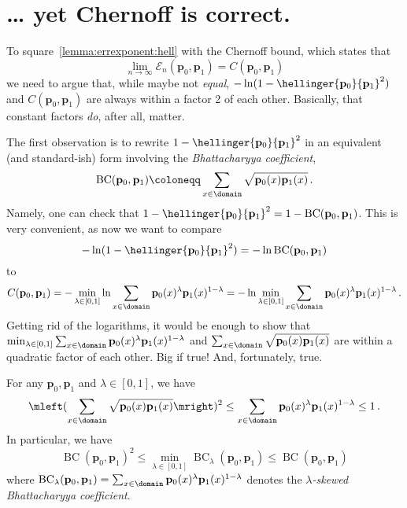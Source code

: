 \documentclass[10pt]{article}
\renewcommand{\eqdef}{\coloneqq}
\newcommand{\p}{\mathbf{p}}
\newcommand{\ns}{n}
\newcommand{\errexp}{\mathcal{E}}
\begin{document}
\section{\dots{} yet Chernoff is correct.}
To square~\autoref{lemma:errexponent:hell} with the Chernoff bound, which states that
\begin{equation}
	\lim_{\ns\to \infty}\errexp_\ns(\p_0,\p_1) = C(\p_0,\p_1)
\end{equation}
we need to argue that, while maybe not \emph{equal}, $-\ln(1-\hellinger{\p_0}{\p_1}^2)$ and $C(\p_0,\p_1)$ are always within a factor 2 of each other. Basically, that constant factors \emph{do}, after all, matter.

The first observation is to rewrite $1-\hellinger{\p_0}{\p_1}^2$ in an equivalent (and standard-ish) form involving the \emph{Bhattacharyya coefficient},
\begin{equation}
	\operatorname{BC}(\p_0,\p_1) \eqdef \sum_{x\in\domain} \sqrt{\p_0(x) \p_1(x)}\,.
\end{equation}
Namely, one can check that 
$
1-\hellinger{\p_0}{\p_1}^2 = 1 - \operatorname{BC}(\p_0,\p_1)$. This is very convenient, as now we want to compare
\[
	-\ln(1-\hellinger{\p_0}{\p_1}^2)
	= -\ln \operatorname{BC}(\p_0,\p_1)
\]
to
\[
	C(\p_0,\p_1) 
	= -\min_{\lambda\in[0,1]} \ln \sum_{x\in\domain} \p_0(x)^\lambda\p_1(x)^{1-\lambda} 
	= - \ln  \min_{\lambda\in[0,1]} \sum_{x\in\domain} \p_0(x)^\lambda\p_1(x)^{1-\lambda}\,. 
\]
Getting rid of the logarithms, it would be enough to show that 
$\min_{\lambda\in[0,1]} \sum_{x\in\domain} \p_0(x)^\lambda\p_1(x)^{1-\lambda}$
and 
$
\sum_{x\in\domain} \sqrt{\p_0(x) \p_1(x)}
$
are within a quadratic factor of each other. Big if true! And, fortunately, true. 
\begin{lemma}
For any $\p_0,\p_1$ and $\lambda\in[0,1]$, we have
\begin{equation}
		\mleft(\sum_{x\in\domain} \sqrt{\p_0(x) \p_1(x)}\mright)^2 \leq \sum_{x\in\domain} \p_0(x)^\lambda\p_1(x)^{1-\lambda} \leq 1\,.
\end{equation}
In particular, we have
\begin{equation}
\operatorname{BC}(\p_0,\p_1)^2 \leq \min_{\lambda\in[0,1]} \operatorname{BC}_\lambda(\p_0,\p_1) \leq \operatorname{BC}(\p_0,\p_1)
\end{equation}
where $\operatorname{BC}_\lambda(\p_0,\p_1) = \sum_{x\in\domain} \p_0(x)^\lambda\p_1(x)^{1-\lambda}$ denotes the \emph{$\lambda$-skewed Bhattacharyya coefficient}.
\end{lemma}
\end{document}
